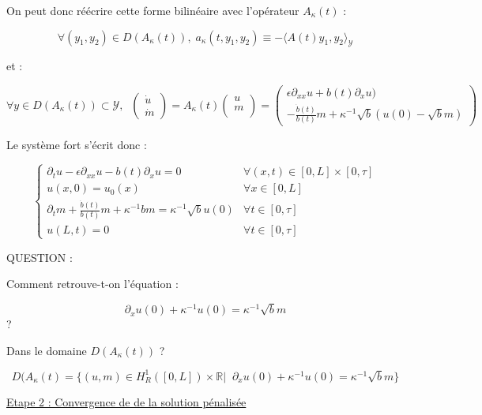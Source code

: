 \documentclass[a4paper]{article}
\newcommand{\dep}{b}
\newcommand{\Y}{\mathscr{Y}}
\newcommand{\Ak}{A_{\kappa}}
\begin{document}
On peut donc réécrire cette forme bilinéaire avec l'opérateur $\Ak(t)$ :

 \[ \forall (y_1,y_2) \in D(\Ak (t)), \; 
 a_\kappa(t,y_1,y_2) \equiv - \langle A(t) y_1,y_2\rangle_{\mathscr{Y}} \]
 

et :
 
 \[ \forall y \in D(A_\kappa (t)) \subset \Y, \; \; 
 \left( \begin{array}{c}
 \dot{u}\\
 \dot{m}
 \end{array} \right)
 = \Ak (t) \left( \begin{array}{c}
 u\\
 m\\
 \end{array} \right) 
 = \left(\begin{array}{c}
 \epsilon \partial_{xx} u +\dep (t)\partial_xu )\\
- \displaystyle \frac{\dot{\dep}(t)}{\dep(t)}m 
+ \kappa^{-1}\sqrt{\dep}(u(0)-\sqrt{\dep}m)
 \end{array}\right) \]
 
 Le système fort s'écrit donc :
 
 \begin{equation}
 \label{eq:cas3b}
 \begin{cases}
  \partial_t u -\epsilon \partial_{xx} u - \dep (t)\partial_x u 
   = 0 & \forall (x,t) \in [0,L] \times [0, \tau]\\
  u(x,0) = u_{0} (x) & \forall x \in [0,L] \\
  \partial_t m + \displaystyle \frac{\dot{\dep}(t)}{\dep(t)}m 
   + \kappa^{-1} \dep m = \kappa^{-1}\sqrt{\dep}u(0) 
   & \forall t \in [0,\tau]\\
  u(L,t)=0 & \forall t \in [0,\tau]
 \end{cases}
 \end{equation}
 
 QUESTION :

 Comment retrouve-t-on l'équation :
 
 \[  \partial_xu(0) + \kappa^{-1} u(0) = \kappa^{-1} \sqrt{\dep}m \] ?
 
 
 Dans le domaine $D(\Ak (t))$ ?
 
 \[D(\Ak(t) = \{ (u,m) \in H_R^1([0,L])\times \mathbb{R} | \; \;
                   \partial_xu(0) + \kappa^{-1} u(0) = \kappa^{-1} \sqrt{\dep}m \} \]

\vspace{0.3cm}
\underline{Etape 2 : Convergence de de la solution pénalisée}
\end{document}
